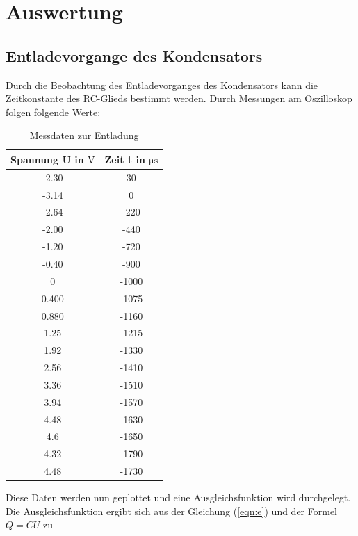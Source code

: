 \newpage
\section{Auswertung}

\subsection{Entladevorgange des Kondensators}
\label{sub:a}
    Durch die Beobachtung des Entladevorganges des Kondensators kann die Zeitkonstante des RC-Glieds bestimmt werden. Durch Messungen am Oszilloskop folgen folgende Werte:
        \begin{table}
        \centering
        \begin{tabular}{c c}
            \toprule
            {Spannung U in $\si{\volt}$} & {Zeit t in $\si{\micro\second} $} \\
            \midrule
            -2.30 & 30    \\
            -3.14 & 0     \\
            -2.64 & -220  \\
            -2.00 & -440  \\
            -1.20 & -720  \\
            -0.40 & -900  \\
                0 & -1000 \\
            0.400 & -1075 \\
            0.880 & -1160 \\
             1.25 & -1215 \\
             1.92 & -1330 \\
             2.56 & -1410 \\
             3.36 & -1510 \\
             3.94 & -1570 \\
             4.48 & -1630 \\
             4.6  & -1650 \\ 
             4.32 & -1790 \\
             4.48 & -1730 \\
            \bottomrule
        \end{tabular}
        \caption{Messdaten zur Entladung}
        \label{tab:a}
        \end{table}

    \noindent
    Diese Daten werden nun geplottet und eine Ausgleichsfunktion wird durchgelegt. Die Ausgleichsfunktion ergibt sich aus der Gleichung (\ref{eqn:e}) und der Formel $ Q = CU $ zu 
    
